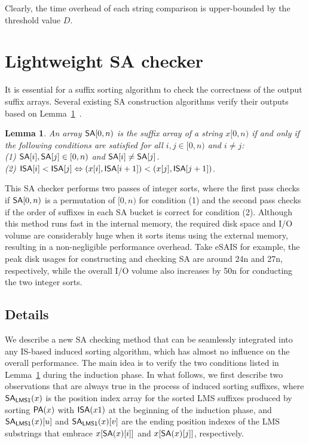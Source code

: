\documentclass[10pt,journal,compsoc]{IEEEtran}
\newtheorem{lemma}[theorem]{Lemma}
\begin{document}
Clearly, the time overhead of each string comparison is upper-bounded by the threshold value $D$.

\section{Lightweight SA checker} \label{sec:sachecker}

It is essential for a suffix sorting algorithm to check the correctness of the output suffix arrays. Several existing SA construction algorithms verify their outputs based on Lemma~\ref{lemma:1}~\cite{Karkkainen2003}.

\begin{lemma} \label{lemma:1}
	An array ${\sf SA}[0, n)$ is the suffix array of a string $x[0, n)$ if and only if the following conditions are satisfied for all $i, j \in [0, n)$ and $i\ne j$:\\
	(1) ${\sf SA}[i], {\sf SA}[j] \in [0, n)$ and ${\sf SA}[i] \ne {\sf SA}[j]$. \\
	(2)	${\sf ISA}[i] < {\sf ISA}[j] \Leftrightarrow (x[i], {\sf ISA}[i + 1]) < (x[j], {\sf ISA}[j + 1])$.
\end{lemma}

This SA checker performs two passes of integer sorts, where the first pass checks if ${\sf SA}[0, n)$ is a permutation of $[0, n)$ for condition (1) and the second pass checks if the order of suffixes in each SA bucket is correct for condition (2). Although this method runs fast in the internal memory, the required disk space and I/O volume are considerably huge when it sorts items using the external memory, resulting in a non-negligible performance overhead. Take eSAIS for example, the peak disk usages for constructing and checking SA are around 24n and 27n, respectively, while the overall I/O volume also increases by 50n for conducting the two integer sorts.

\subsection{Details}\label{subsec:sachecker:details}

We describe a new SA checking method that can be seamlessly integrated into any IS-based induced sorting algorithm, which has almost no influence on the overall performance. The main idea is to verify the two conditions listed in Lemma~\ref{lemma:1} during the induction phase. In what follows, we first describe two observations that are always true in the process of induced sorting suffixes, where ${\sf SA_{LMS1}}(x)$ is the position index array for the sorted LMS suffixes produced by sorting ${\sf PA}(x)$ with ${\sf ISA}(x1)$ at the beginning of the induction phase, and ${\sf SA_{LMS1}}(x)[u]$ and ${\sf SA_{LMS1}}(x)[v]$ are the ending position indexes of the LMS substrings that embrace $x[{\sf SA}(x)[i]]$ and $x[{\sf SA}(x)[j]]$, respectively.
\end{document}
